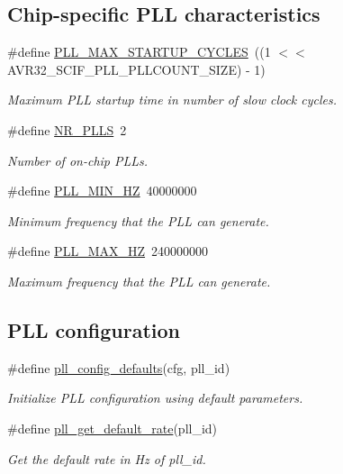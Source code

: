 \subsection*{\-Chip-\/specific \-P\-L\-L characteristics}
\begin{DoxyCompactItemize}
\item 
\#define \hyperlink{group__pll__group_ga3a7cd8f570834e0f208037619b798aef}{\-P\-L\-L\-\_\-\-M\-A\-X\-\_\-\-S\-T\-A\-R\-T\-U\-P\-\_\-\-C\-Y\-C\-L\-E\-S}~((1 $<$$<$ \-A\-V\-R32\-\_\-\-S\-C\-I\-F\-\_\-\-P\-L\-L\-\_\-\-P\-L\-L\-C\-O\-U\-N\-T\-\_\-\-S\-I\-Z\-E) -\/ 1)
\begin{DoxyCompactList}\small\item\em \-Maximum \-P\-L\-L startup time in number of slow clock cycles. \end{DoxyCompactList}\item 
\#define \hyperlink{group__pll__group_ga23ebd75638f609ce613b82e773ea48a5}{\-N\-R\-\_\-\-P\-L\-L\-S}~2
\begin{DoxyCompactList}\small\item\em \-Number of on-\/chip \-P\-L\-Ls. \end{DoxyCompactList}\item 
\#define \hyperlink{group__pll__group_ga58acd4425beaa32dad5ccffa073cb0a5}{\-P\-L\-L\-\_\-\-M\-I\-N\-\_\-\-H\-Z}~40000000
\begin{DoxyCompactList}\small\item\em \-Minimum frequency that the \-P\-L\-L can generate. \end{DoxyCompactList}\item 
\#define \hyperlink{group__pll__group_gaeced77fb7ec635ab33085a71a0c15227}{\-P\-L\-L\-\_\-\-M\-A\-X\-\_\-\-H\-Z}~240000000
\begin{DoxyCompactList}\small\item\em \-Maximum frequency that the \-P\-L\-L can generate. \end{DoxyCompactList}\end{DoxyCompactItemize}
\subsection*{\-P\-L\-L configuration}
\begin{DoxyCompactItemize}
\item 
\#define \hyperlink{group__pll__group_ga2b9ba9ce6a7290303f6e8d41191fd0d8}{pll\-\_\-config\-\_\-defaults}(cfg, pll\-\_\-id)
\begin{DoxyCompactList}\small\item\em \-Initialize \-P\-L\-L configuration using default parameters. \end{DoxyCompactList}\item 
\#define \hyperlink{group__pll__group_ga16c8db5e3f1a2c759a88371120579c4d}{pll\-\_\-get\-\_\-default\-\_\-rate}(pll\-\_\-id)
\begin{DoxyCompactList}\small\item\em \-Get the default rate in \-Hz of {\itshape pll\-\_\-id\/}. \end{DoxyCompactList}\end{DoxyCompactItemize}

